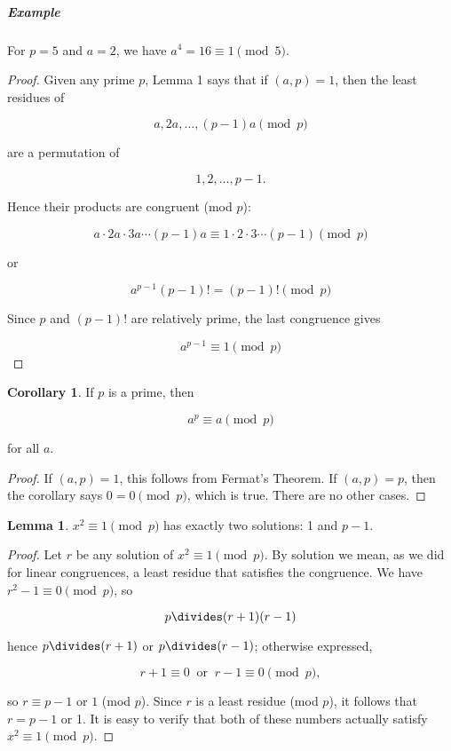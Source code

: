 \documentclass{article}
\theoremstyle{definition} %
\theoremstyle{definition}
\newtheorem{corollary}{Corollary}[section] %
\theoremstyle{definition}
\newtheorem{lemma}{Lemma}[section]
\theoremstyle{definition}
\begin{document}
  \subparagraph{Example} For $p = 5$ and $a = 2$, we have $a^4 = 16
    \equiv 1 \pmod{5}$.
    
  \begin{proof}
    Given any prime $p$, Lemma 1 says that if $(a, p) = 1$, then the
    least residues of
    
    \[ a, 2a, \dots, (p - 1)a \pmod{p} \]
    
    are a permutation of
    
    \[ 1, 2, \dots, p - 1. \]
    
    Hence their products are congruent (mod $p$):
    
    \[ a \cdot 2a \cdot 3a \cdots (p - 1)a \equiv 1 \cdot 2 \cdot 3 \cdots (p - 1) \pmod{p} \]
    
    or
    
    \[ a^{p - 1}(p - 1)! = (p - 1)! \pmod{p} \]
    
    Since $p$ and $(p - 1)!$ are relatively prime, the last congruence gives
    
    \[ a^{p - 1} \equiv 1 \pmod{p} \]
  \end{proof}
  
  \begin{corollary}
    If $p$ is a prime, then
    
    \[ a^p \equiv a \pmod{p} \]
    
    for all $a$.
  \end{corollary}
  
  \begin{proof}
    If $(a, p) = 1$, this follows from Fermat's Theorem. If $(a, p) = p$, then the corollary
    says $0 = 0 \pmod{p}$, which is true. There are no other cases.
  \end{proof}
  
  \begin{lemma}
    $x^2 \equiv 1 \pmod{p}$ has exactly two solutions: 1 and $p - 1$.
  \end{lemma}
  
  \begin{proof}
    Let $r$ be any solution of $x^2 \equiv 1 \pmod{p}$. By solution we mean, as we did
    for linear congruences, a least residue that satisfies the congruence. We have
    $r^2 - 1 \equiv 0 \pmod{p}$, so
    
    \[ p \divides (r + 1)(r - 1) \]
    
    hence $p \divides (r + 1)$ or $p \divides (r - 1)$; otherwise expressed,
    
    \[ r + 1 \equiv 0 \;\;\text{or}\;\; r -1 \equiv 0 \pmod{p}, \]
    
    so $r \equiv p - 1$ or $1$ (mod $p$). Since $r$ is a least residue (mod $p$),
    it follows that $r = p - 1$ or 1. It is easy to verify that both of these numbers
    actually satisfy $x^2 \equiv 1 \pmod{p}$.
  \end{proof}
  
\end{document}
